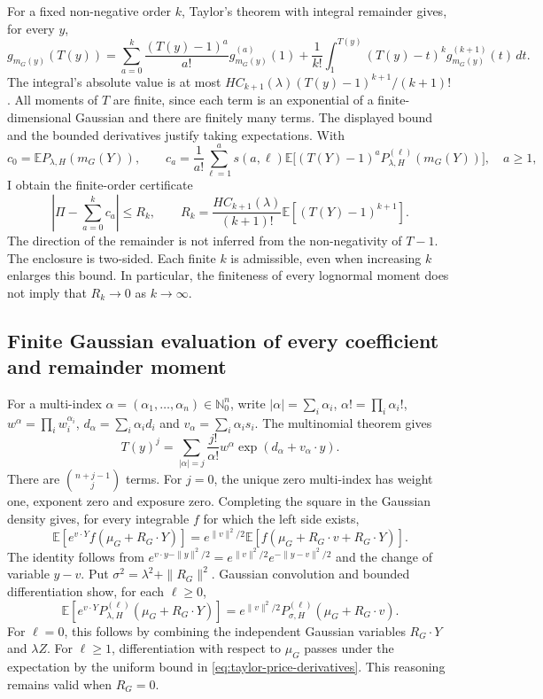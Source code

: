 For a fixed non-negative order $k$, Taylor's theorem with integral remainder gives, for every $y$,
\[
 g_{m_G(y)}(T(y))
 =\sum_{a=0}^k\frac{(T(y)-1)^a}{a!}g_{m_G(y)}^{(a)}(1)
 +\frac1{k!}\int_1^{T(y)}(T(y)-t)^k g_{m_G(y)}^{(k+1)}(t)\,dt.
\]
The integral's absolute value is at most $H C_{k+1}(\lambda)(T(y)-1)^{k+1}/(k+1)!$. All moments of $T$ are finite, since each term is an exponential of a finite-dimensional Gaussian and there are finitely many terms. The displayed bound and the bounded derivatives justify taking expectations. With
\begin{equation}
 c_0=\mathbb E P_{\lambda,H}(m_G(Y)),\qquad
 c_a=\frac1{a!}\sum_{\ell=1}^a s(a,\ell)
       \mathbb E\bigl[(T(Y)-1)^aP_{\lambda,H}^{(\ell)}(m_G(Y))\bigr],\quad a\geq1,
 \label{eq:taylor-coefficients}
\end{equation}
I obtain the finite-order certificate
\begin{equation}
 \left|\Pi-\sum_{a=0}^k c_a\right|
 \leq R_k,\qquad
 R_k=\frac{H C_{k+1}(\lambda)}{(k+1)!}\mathbb E[(T(Y)-1)^{k+1}].
 \label{eq:taylor-price-remainder}
\end{equation}
The direction of the remainder is not inferred from the non-negativity of $T-1$. The enclosure is two-sided. Each finite $k$ is admissible, even when increasing $k$ enlarges this bound. In particular, the finiteness of every lognormal moment does not imply that $R_k\to0$ as $k\to\infty$.

\subsection{Finite Gaussian evaluation of every coefficient and remainder moment}
\label{sec:taylor-gaussian-tilt}

For a multi-index $\alpha=(\alpha_1,\ldots,\alpha_n)\in\mathbb N_0^n$, write $|\alpha|=\sum_i\alpha_i$, $\alpha!=\prod_i\alpha_i!$, $w^\alpha=\prod_iw_i^{\alpha_i}$, $d_\alpha=\sum_i\alpha_id_i$ and $v_\alpha=\sum_i\alpha_is_i$. The multinomial theorem gives
\[
 T(y)^j=\sum_{|\alpha|=j}\frac{j!}{\alpha!}w^\alpha
             \exp(d_\alpha+v_\alpha\cdot y).
\]
There are $\binom{n+j-1}{j}$ terms. For $j=0$, the unique zero multi-index has weight one, exponent zero and exposure zero. Completing the square in the Gaussian density gives, for every integrable $f$ for which the left side exists,
\[
 \mathbb E[e^{v\cdot Y}f(\mu_G+R_G\cdot Y)]
 =e^{\|v\|^2/2}\mathbb E[f(\mu_G+R_G\cdot v+R_G\cdot Y)].
\]
The identity follows from $e^{v\cdot y-\|y\|^2/2}=e^{\|v\|^2/2}e^{-\|y-v\|^2/2}$ and the change of variable $y-v$. Put $\sigma^2=\lambda^2+\|R_G\|^2$. Gaussian convolution and bounded differentiation show, for each $\ell\geq0$,
\begin{equation}
 \mathbb E[e^{v\cdot Y}P_{\lambda,H}^{(\ell)}(\mu_G+R_G\cdot Y)]
 =e^{\|v\|^2/2}P_{\sigma,H}^{(\ell)}(\mu_G+R_G\cdot v).
 \label{eq:taylor-tilt-identity}
\end{equation}
For $\ell=0$, this follows by combining the independent Gaussian variables $R_G\cdot Y$ and $\lambda Z$. For $\ell\geq1$, differentiation with respect to $\mu_G$ passes under the expectation by the uniform bound in \eqref{eq:taylor-price-derivatives}. This reasoning remains valid when $R_G=0$.


